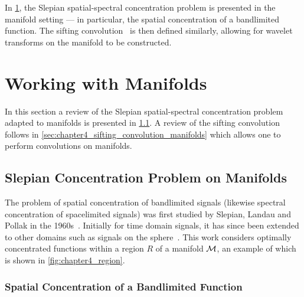 In \cref{sec:chapter4_working_with_manifolds}, the Slepian spatial-spectral concentration problem is presented in the manifold setting --- in particular, the spatial concentration of a bandlimited function.
The sifting convolution~\cite{Roddy2021} is then defined similarly, allowing for wavelet transforms on the manifold to be constructed.

\section{Working with Manifolds}\label{sec:chapter4_working_with_manifolds}

In this section a review of the Slepian spatial-spectral concentration problem adapted to manifolds is presented in \cref{sec:chapter4_slepian_concentration_problem_manifolds}.
A review of the sifting convolution follows in \cref{sec:chapter4_sifting_convolution_manifolds} which allows one to perform convolutions on manifolds.

\subsection{Slepian Concentration Problem on Manifolds}\label{sec:chapter4_slepian_concentration_problem_manifolds}

The problem of spatial concentration of bandlimited signals (likewise spectral concentration of spacelimited signals) was first studied by Slepian, Landau and Pollak in the 1960s~\cite{Slepian1961,Landau1961,Landau1962}.
Initially for time domain signals, it has since been extended to other domains such as signals on the sphere~\cite{Simons2006,Roddy2021a,Xu1983,Wieczorek2005}.
This work considers optimally concentrated functions within a region \(R\) of a manifold \(\mathcal{M}{}\), an example of which is shown in \cref{fig:chapter4_region}.



\subsubsection{Spatial Concentration of a Bandlimited Function}

